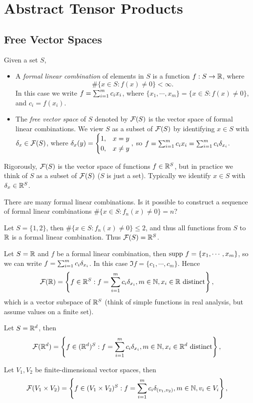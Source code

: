 \section{Abstract Tensor Products}
\subsection{Free Vector Spaces}
Given a set $S$, 
\begin{itemize}
    \item A \textit{formal linear combination} of elements in $S$ is a function $f:S \to \mathbb{R}$, where $$\#\{x \in S: f(x) \neq 0\} < \infty.$$
    In this case we write $f = \sum_{i=1}^{m}c_i x_i$, where $\{x_1, \cdots, x_m\} = \{x \in S: f(x) \neq 0\}$, and $c_i = f(x_i)$. 
    \item The \textit{free vector space} of $S$ denoted by $\mathcal{F}(S)$ is the vector space of formal linear combinations. We view $S$ as a subset of $\mathcal{F}(S)$ by identifying $x \in S$ with $\delta_x \in \mathcal{F}(S)$, where $\delta_x(y) = \begin{cases} 1, & x = y \\ 0, & x \neq y \end{cases},$ so $f = \sum_{i=1}^{m}c_i x_i = \sum_{i=1}^{m}c_i \delta_{x_i}$.
\end{itemize}
Rigorously, $\mathcal{F}(S)$ is the vector space of functions $f \in \mathbb{R}^S$, but in practice we think of $S$ as a subset of $\mathcal{F}(S)$ ($S$ is just a set). Typically we identify $x \in S$ with $\delta_x \in \mathbb{R}^S$. 

{\color{blue}There are many formal linear combinations. Is it possible to construct 
a sequence of formal linear combinations $\#\{x \in S: f_n(x) \neq 0\} = n$? }
\begin{example}
    Let $S = \{1, 2\}$, then $\#\{x \in S: f_n(x) \neq 0\} \leq 2$, and thus all functions from $S$ to $\mathbb{R}$ is a formal linear combination. Thus $\mathcal{F}(S) = \mathbb{R}^S$. 
\end{example}
\begin{example}
    Let $S = \mathbb{R}$ and $f$ be a formal linear combination, then $\mathrm{supp~} f = \{x_1, \cdots, x_m\}$, so we can write $f = \sum_{i=1}^{m}c_i \delta_{x_i}$. In this case $\Im f = \{c_1, \cdots, c_m\}$. Hence 
    $$\mathcal{F}(\mathbb{R}) = \left\{
    f \in \mathbb{R}^S: f = \sum_{i=1}^{m}c_i \delta_{x_i}, m \in \mathbb{N}, x_i \in \mathbb{R} \text{ distinct}
    \right\},$$ which is a vector subspace of $\mathbb{R}^S$ (think of simple functions in real analysis, but assume values on a finite set).
\end{example}
\begin{example}
    Let $S = \mathbb{R}^d$, then 
    $$\mathcal{F}(\mathbb{R}^d) = \left\{
    f \in (\mathbb{R}^d)^S: f = \sum_{i=1}^{m}c_i \delta_{x_i}, m \in \mathbb{N}, x_i \in \mathbb{R}^d \text{ distinct}
    \right\},$$
\end{example}
\begin{example}
    Let $V_1, V_2$ be finite-dimensional vector spaces, then 
    $$\mathcal{F}(V_1 \times V_2) = \left\{
    f \in (V_1 \times V_2)^S: f = \sum_{i=1}^{m}c_i \delta_{(v_1,v_2)}, m \in \mathbb{N}, v_i \in V_i
    \right\},$$
\end{example}


